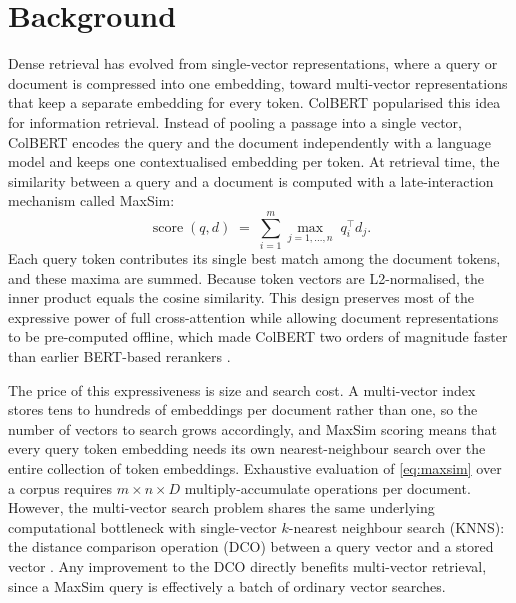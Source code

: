 \section{Background}

Dense retrieval has evolved from single-vector representations, where a query or 
document is compressed into one embedding, toward multi-vector representations 
that keep a separate embedding for every token. ColBERT \citep{khattab2020colbert} 
popularised this idea for information retrieval. Instead of pooling a passage into 
a single vector, ColBERT encodes the query and the document independently with a 
language model and keeps one contextualised embedding per token. At retrieval time, 
the similarity between a query and a document is computed with a late-interaction 
mechanism called MaxSim:
\begin{equation}
  \operatorname{score}(q, d)
  \;=\;
  \sum_{i=1}^{m} \max_{j = 1, \dots, n} \; q_i^{\top} d_j .
  \label{eq:maxsim}
\end{equation}
Each query token contributes its single best match among the document tokens, and 
these maxima are summed. Because token vectors are L2-normalised, the inner product 
equals the cosine similarity. This design preserves most of the expressive power 
of full cross-attention while allowing document representations to be pre-computed 
offline, which made ColBERT two orders of magnitude faster than earlier BERT-based 
rerankers \citep{khattab2020colbert}.

The price of this expressiveness is size and search cost. A multi-vector index 
stores tens to hundreds of embeddings per document rather than one, so the number 
of vectors to search grows accordingly, and MaxSim scoring means that every query 
token embedding needs its own nearest-neighbour search over the entire collection 
of token embeddings. Exhaustive evaluation of \cref{eq:maxsim} over a corpus 
requires $m \times n \times D$ multiply-accumulate operations per document. 
However, the multi-vector search problem shares the same underlying computational 
bottleneck with single-vector $k$-nearest neighbour search (KNNS): the distance 
comparison operation (DCO) between a query vector and a stored vector 
\citep{kuffo2025pdx}. Any improvement to the DCO directly benefits multi-vector 
retrieval, since a MaxSim query is effectively a batch of ordinary vector searches.

